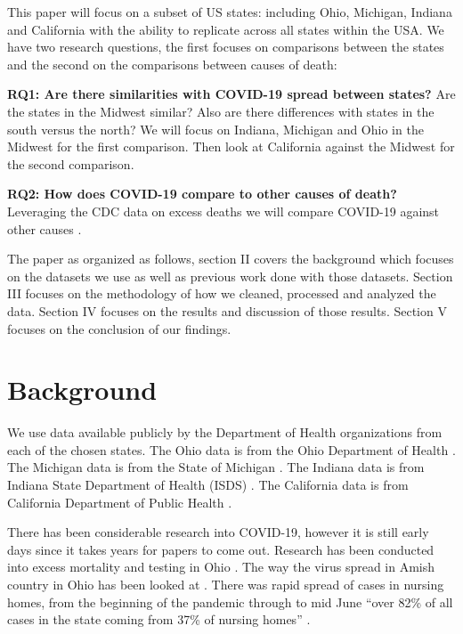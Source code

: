 \documentclass[conference]{IEEEtran}
\begin{document}
This paper will focus on a subset of US states: including Ohio, Michigan, Indiana and California with the ability to replicate across all states within the USA.
We have two research questions, the first focuses on comparisons between the states and the second on the comparisons between causes of death:

\textbf{RQ1: Are there similarities with COVID-19 spread between states?} Are the states in the Midwest similar? Also are there differences with states in the south versus the north? We will focus on Indiana, Michigan and Ohio in the Midwest for the first comparison. Then look at California against the Midwest for the second comparison.

\textbf{RQ2: How does COVID-19 compare to other causes of death?} Leveraging the CDC data on excess deaths we will compare COVID-19 against other causes \cite{cdc_weekly_nodate}.


The paper as organized as follows, section II covers the background which focuses on the datasets we use as well as previous work done with those datasets.
Section III focuses on the methodology of how we cleaned, processed and analyzed the data.
Section IV focuses on the results and discussion of those results.
Section V focuses on the conclusion of our findings.

\section{Background}

We use data available publicly by the Department of Health organizations from each of the chosen states.
The Ohio data is from the Ohio Department of Health \cite{system_covid-19_nodate}.
The Michigan data is from the State of Michigan \cite{noauthor_coronavirus_nodate}.
The Indiana data is from Indiana State Department of Health (ISDS) \cite{noauthor_indiana_nodate}.
The California data is from California Department of Public Health \cite{noauthor_tracking_nodate}.

There has been considerable research into COVID-19, however it is still early days since it takes years for papers to come out.
Research has been conducted into excess mortality and testing in Ohio \cite{quast_excess_2020}.
The way the virus spread in Amish country in Ohio has been looked at \cite{ali_covid-19_2020}.
There was rapid spread of cases in nursing homes, from the beginning of the pandemic through to mid June ``over 82\% of all cases in the state coming from 37\% of nursing homes'' \cite{bowblis_prevalence_2020}.
\end{document}
